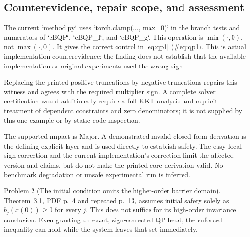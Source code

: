 \documentclass[10pt]{article}
\begin{document}
\subsection*{Counterevidence, repair scope, and assessment}
The current `method.py` uses `torch.clamp(..., max=0)` in the branch tests and numerators of `eBQP`, `eBQP\_I`, and `eBQP\_g`. This operation is \(\min(\cdot,0)\), not \(\max(\cdot,0)\). It gives the correct control in [eq:qp1] (\#eq:qp1). This is actual implementation counterevidence: the finding does not establish that the available implementation or original experiments used the wrong sign.\par
Replacing the printed positive truncations by negative truncations repairs this witness and agrees with the required multiplier sign. A complete solver certification would additionally require a full KKT analysis and explicit treatment of dependent constraints and zero denominators; it is not supplied by this one example or by static code inspection.\par
The supported impact is Major. A demonstrated invalid closed-form derivation is the defining explicit layer and is used directly to establish safety. The easy local sign correction and the current implementation’s correction limit the affected version and claims, but do not make the printed core derivation valid. No benchmark degradation or unsafe experimental run is inferred.\par
Problem 2 (The initial condition omits the higher-order barrier domain).  Theorem 3.1, PDF p. 4 and repeated p. 13, assumes initial safety solely as \(b_j(x(0))\ge0\) for every \(j\). This does not suffice for its high-order invariance conclusion. Even granting an exact, sign-corrected QP head, the enforced inequality can hold while the system leaves that set immediately.\par
\end{document}
